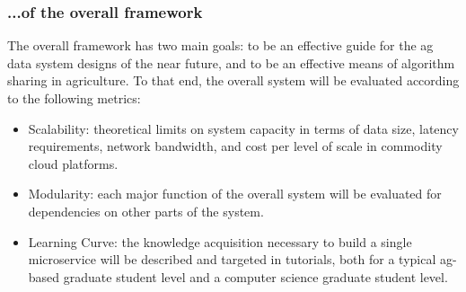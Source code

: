 \documentclass[11pt]{article}
\begin{document}
\subsubsection{ ...of the overall framework}   

The overall framework has two main goals: to be an effective guide for the ag data system designs of the 
near future, and to be an effective means of algorithm sharing in agriculture.  To that end, the overall system 
will be evaluated according to the following metrics:

\begin{itemize}
\item Scalability: theoretical limits on system capacity in terms of data size, latency requirements, network bandwidth, 
	and cost per level of scale in commodity cloud platforms.
\item Modularity: each major function of the overall system will be evaluated for dependencies on other parts of the system.  
\item Learning Curve: the knowledge acquisition necessary to build a single microservice will be 
	described and targeted in tutorials, both for a typical ag-based graduate student level and a computer 
	science graduate student level.
\end{itemize}



\newpage

\setcounter{page}{1}



\end{document}
